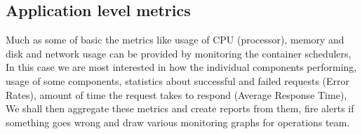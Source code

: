 \documentclass{article}
\begin{document}
\subsection{Application level metrics}

Much as some of basic the metrics like usage of CPU (processor), memory and disk and network usage can be provided by monitoring the container schedulers, In this case we are most interested in how the individual components performing, usage of some components, statistics about successful and failed requests (Error Rates), amount of time the request takes to respond (Average Response Time),  We shall then aggregate these metrics and create reports from them, fire alerts if something goes wrong and draw various monitoring graphs for operations team. 
\end{document}
